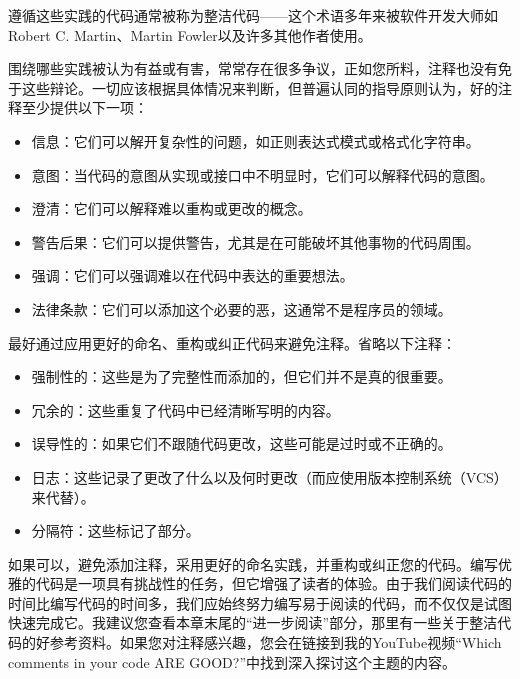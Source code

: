 遵循这些实践的代码通常被称为整洁代码——这个术语多年来被软件开发大师如Robert C. Martin、Martin Fowler以及许多其他作者使用。

围绕哪些实践被认为有益或有害，常常存在很多争议，正如您所料，注释也没有免于这些辩论。一切应该根据具体情况来判断，但普遍认同的指导原则认为，好的注释至少提供以下一项：

\begin{itemize}
\item
信息：它们可以解开复杂性的问题，如正则表达式模式或格式化字符串。

\item
意图：当代码的意图从实现或接口中不明显时，它们可以解释代码的意图。

\item
澄清：它们可以解释难以重构或更改的概念。

\item
警告后果：它们可以提供警告，尤其是在可能破坏其他事物的代码周围。

\item
强调：它们可以强调难以在代码中表达的重要想法。

\item
法律条款：它们可以添加这个必要的恶，这通常不是程序员的领域。
\end{itemize}

最好通过应用更好的命名、重构或纠正代码来避免注释。省略以下注释：

\begin{itemize}
\item
强制性的：这些是为了完整性而添加的，但它们并不是真的很重要。

\item
冗余的：这些重复了代码中已经清晰写明的内容。

\item
误导性的：如果它们不跟随代码更改，这些可能是过时或不正确的。

\item
日志：这些记录了更改了什么以及何时更改（而应使用版本控制系统（VCS）来代替）。

\item
分隔符：这些标记了部分。
\end{itemize}

如果可以，避免添加注释，采用更好的命名实践，并重构或纠正您的代码。编写优雅的代码是一项具有挑战性的任务，但它增强了读者的体验。由于我们阅读代码的时间比编写代码的时间多，我们应始终努力编写易于阅读的代码，而不仅仅是试图快速完成它。我建议您查看本章末尾的“进一步阅读”部分，那里有一些关于整洁代码的好参考资料。如果您对注释感兴趣，您会在链接到我的YouTube视频“Which comments in your code ARE GOOD?”中找到深入探讨这个主题的内容。

